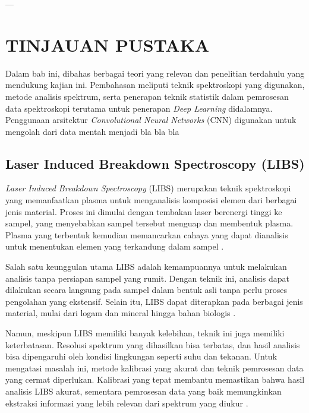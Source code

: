 
---

\chapter{TINJAUAN PUSTAKA}
\par Dalam bab ini, dibahas berbagai teori yang relevan dan penelitian terdahulu yang mendukung kajian ini. Pembahasan meliputi teknik spektroskopi yang digunakan, metode analisis spektrum, serta penerapan teknik statistik dalam pemrosesan data spektroskopi terutama untuk penerapan \textit{Deep Learning} didalamnya. Penggunaan arsitektur \textit{Convolutional Neural Networks} (CNN) digunakan untuk mengolah dari data mentah menjadi bla bla bla 

\section{Laser Induced Breakdown Spectroscopy (LIBS)}
\par \textit{Laser Induced Breakdown Spectroscopy} (LIBS) merupakan teknik spektroskopi yang memanfaatkan plasma untuk menganalisis komposisi elemen dari berbagai jenis material. Proses ini dimulai dengan tembakan laser berenergi tinggi ke sampel, yang menyebabkan sampel tersebut menguap dan membentuk plasma. Plasma yang terbentuk kemudian memancarkan cahaya yang dapat dianalisis untuk menentukan elemen yang terkandung dalam sampel \citep{morris2008}. 

\par Salah satu keunggulan utama LIBS adalah kemampuannya untuk melakukan analisis tanpa persiapan sampel yang rumit. Dengan teknik ini, analisis dapat dilakukan secara langsung pada sampel dalam bentuk asli tanpa perlu proses pengolahan yang ekstensif. Selain itu, LIBS dapat diterapkan pada berbagai jenis material, mulai dari logam dan mineral hingga bahan biologis \citep{harrison2002}. 

\par Namun, meskipun LIBS memiliki banyak kelebihan, teknik ini juga memiliki keterbatasan. Resolusi spektrum yang dihasilkan bisa terbatas, dan hasil analisis bisa dipengaruhi oleh kondisi lingkungan seperti suhu dan tekanan. Untuk mengatasi masalah ini, metode kalibrasi yang akurat dan teknik pemrosesan data yang cermat diperlukan. Kalibrasi yang tepat membantu memastikan bahwa hasil analisis LIBS akurat, sementara pemrosesan data yang baik memungkinkan ekstraksi informasi yang lebih relevan dari spektrum yang diukur \citep{corsi2011}.

